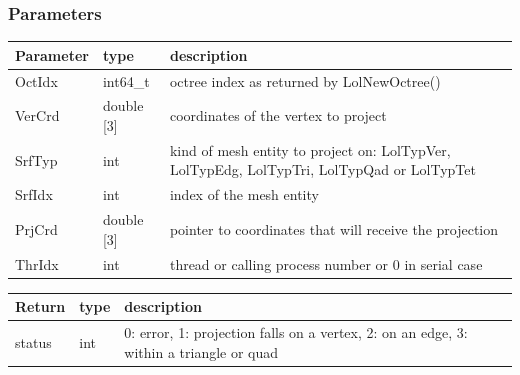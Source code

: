 \documentclass[a4paper,12pt]{article}
\begin{document}
\subsubsection*{Parameters}
\begin{tabular}{|m{3cm}|m{2cm}|m{8.5cm}|}
\hline
Parameter  & type       & description \\
\hline
OctIdx     & int64\_t   & octree index as returned by LolNewOctree() \\
\hline
VerCrd     & double [3] & coordinates of the vertex to project \\
\hline
SrfTyp     & int        & kind of mesh entity to project on: LolTypVer, LolTypEdg, LolTypTri, LolTypQad or LolTypTet \\
\hline
SrfIdx     & int        & index of the mesh entity \\
\hline
PrjCrd     & double [3] & pointer to coordinates that will receive the projection \\
\hline
ThrIdx     & int        & thread or calling process number or 0 in serial case \\
\hline
\end{tabular}

\medskip

\begin{tabular}{|m{3cm}|m{2cm}|m{8.5cm}|}
\hline
Return     & type   & description \\
\hline
status     & int    & 0: error, 1: projection falls on a vertex, 2: on an edge, 3: within a triangle or quad \\
\hline
\end{tabular}
\end{document}
